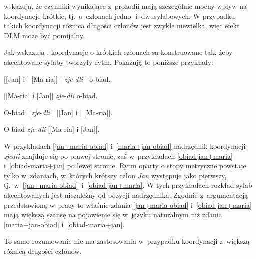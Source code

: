 \cite{wright2005ladies} wskazują, że czynniki wynikające z~prozodii mają szczególnie mocny wpływ na koordynacje krótkie, tj.~o~członach jedno- i~dwusylabowych. W przypadku takich koordynacji różnica długości członów jest zwykle niewielka, więc efekt DLM może być pomijalny.

Jak wskazują \cite{mcdonald1993word}, koordynacje o krótkich członach są konstruowane tak, żeby akcentowane sylaby tworzyły rytm. Pokazują to poniższe przykłady:

\begin{exe}
\ex \label{jan+maria-obiad} {
        {[[Jan] i | [Ma-ria]] |  \textit{zje}-\textit{dli} | o-biad.}
        }
        
\ex \label{maria+jan-obiad} {
        {[[Ma-ria] i [Jan]] \textit{zje}-\textit{dli} o-biad.}
        }
        
\ex \label{obiad-jan+maria} {
        {O-biad | \textit{zje}-\textit{dli} | [[Jan] i | [Ma-ria]].}
        }

\ex \label{obiad-maria+jan} {
        {O-biad \textit{zje}-\textit{dli} [[Ma-ria] i [Jan]].}
        }
\end{exe}
        
W przykładach \eqref{jan+maria-obiad} i~\eqref{maria+jan-obiad} nadrzędnik koordynacji \textit{zjedli} znajduje się po prawej stronie, zaś w~przykładach \eqref{obiad-jan+maria} i~\eqref{obiad-maria+jan} po lewej stronie. Rytm oparty o stopy metryczne powstaje tylko w~zdaniach, w~których krótszy człon \textit{Jan} występuje jako pierwszy, tj.~w~\eqref{jan+maria-obiad}~i~\eqref{obiad-jan+maria}. W tych przykładach rozkład sylab akcentowanych jest niezależny od pozycji nadrzędnika. Zgodnie z~argumentacją przedstawioną w~pracy \cite{mcdonald1993word} to właśnie zdania \eqref{jan+maria-obiad} i~\eqref{obiad-jan+maria} mają większą szansę na pojawienie się w~języku naturalnym niż zdania \eqref{maria+jan-obiad} i~\eqref{obiad-maria+jan}.

To samo rozumowanie nie ma zastosowania w~przypadku koordynacji z~większą różnicą długości członów.

